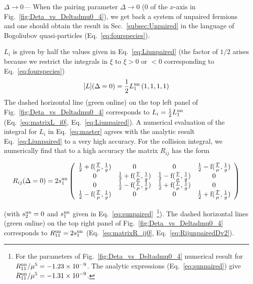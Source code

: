 \documentclass[10pt, aps, prd, superscriptaddress, nofootinbib, 
               amsmath, amssymb, twocolumn,
               preprintnumbers, showpacs,
               raggedbottom,
               floatfix]{revtex4-1}
\newcommand{\f}{{\rm{f}}}
\newcommand{\un}{{\rm{un}}}
\begin{document}
{\textit{$\Delta\rightarrow 0$---}} When the pairing parameter
$\Delta\rightarrow 0$ ($0$ of the $x$-axis in
Fig.~\ref{fig:Deta_vs_Deltadmu0_4}), we get back a system of unpaired fermions
and one should obtain the result in Sec.~\ref{subsec:Unpaired} in the language
of Bogoliubov quasi-particles (Eq.~\ref{eq:fourspecies}).

$L_i$ is given by half the values given in Eq.~\ref{eq:Liunpaired} (the factor
of $1/2$ arises because we restrict the integrals in $\xi$ to $\xi>0$ or $<0$
corresponding to
Eq.~\ref{eq:fourspecies}) 
\begin{equation}
\begin{split}
[L](\Delta=0) = \frac{1}{2}L_1^{\un} 
\left(1, 1, 1, 1\right)\label{eq:matrixL_i0}
\end{split}
\end{equation}
The dashed horizontal line (green online) on the top left panel of
Fig.~\ref{fig:Deta_vs_Deltadmu0_4} corresponds to $L_i=\frac{1}{2}L_1^{\un}$
(Eq.~\ref{eq:matrixL_i0}, Eq.~\ref{eq:Liunpaired}). A numerical evaluation of
the integral for $L_i$ in Eq.~\ref{eq:master} agrees with the analytic result
Eq.~\ref{eq:Liunpaired} to a very high accuracy. For the collision integral, 
we numerically find that to a high accuracy the matrix $R_{ij}$ has the form 
\begin{widetext}
\begin{equation}
\begin{split}
R_{ij}(\Delta=0) = 2s_1^\un
\left(
\begin{array}{cccc}
\frac{1}{2}+\f(\frac{T}{\mu},\frac{1}{g}) & 0 & 0 & \frac{1}{2}-\f(\frac{T}{\mu},\frac{1}{g}) \\
0 & \frac{1}{2}+\f(\frac{T}{\mu},\frac{1}{g}) & \frac{1}{2}-\f(\frac{T}{\mu},\frac{1}{g}) & 0  \\
0 & \frac{1}{2}-\f(\frac{T}{\mu},\frac{1}{g})  & \frac{1}{2}+\f(\frac{T}{\mu},\frac{1}{g}) & 0  \\
\frac{1}{2}-\f(\frac{T}{\mu},\frac{1}{g}) & 0 & 0 & \frac{1}{2}+\f(\frac{T}{\mu},\frac{1}{g})
\end{array}
\right)\label{eq:matrixR_ij0}
\end{split}
\end{equation}
\end{widetext}
(with $s^\un_2=0$ and $s^\un_1$ given in Eq.~\ref{eq:sunpaired}~\footnote{For
the parameters of Fig.~\ref{fig:Deta_vs_Deltadmu0_4} numerical result for
$R^\un_{11}/\mu^5=-1.23\times10^{-9}$. The analytic expressions
(Eq.~\ref{eq:sunpaired}) give $R^\un_{11}/\mu^5=-1.31\times10^{-9}$.}). The
dashed horizontal lines (green online) on the top right panel of
Fig.~\ref{fig:Deta_vs_Deltadmu0_4} corresponds to $R_{11}^\un=2s_1^{\un}$
(Eq.~\ref{eq:matrixR_ij0}, Eq.~\ref{eq:RijunpairedDv2}).
\end{document}
